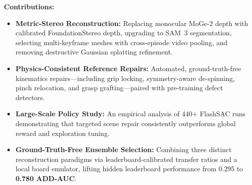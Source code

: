 \documentclass[10pt]{nvidiaextabstract}
\begin{document}
\textbf{Contributions:}
\begin{itemize}\setlength{\itemsep}{1pt}\setlength{\parskip}{0pt}
  \item \textbf{Metric-Stereo Reconstruction:} Replacing monocular MoGe-2 depth with calibrated FoundationStereo depth, upgrading to SAM~3 segmentation, selecting multi-keyframe meshes with cross-episode video pooling, and removing destructive Gaussian splatting refinement.
  \item \textbf{Physics-Consistent Reference Repairs:} Automated, ground-truth-free kinematics repairs—including grip locking, symmetry-aware de-spinning, pinch relocation, and grasp grafting—paired with pre-training defect detectors.
  \item \textbf{Large-Scale Policy Study:} An empirical analysis of 440+ FlashSAC runs demonstrating that targeted scene repair consistently outperforms global reward and exploration tuning.
  \item \textbf{Ground-Truth-Free Ensemble Selection:} Combining three distinct reconstruction paradigms via leaderboard-calibrated transfer ratios and a local board emulator, lifting hidden leaderboard performance from 0.295 to \textbf{0.780 ADD-AUC}.
\end{itemize}
\end{document}
